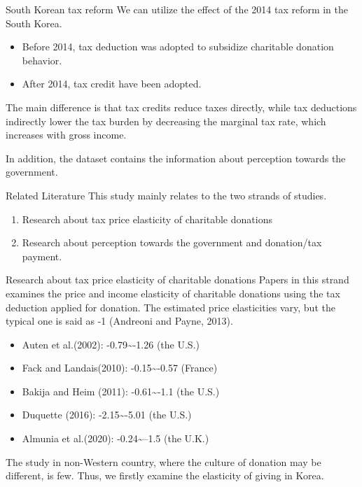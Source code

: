 \documentclass[
  ignorenonframetext,
]{beamer}
\providecommand{\tightlist}{%
  \setlength{\itemsep}{0pt}\setlength{\parskip}{0pt}}
\begin{document}
\begin{frame}{South Korean tax reform}
\protect\hypertarget{south-korean-tax-reform}{}
We can utilize the effect of the 2014 tax reform in the South Korea.

\begin{itemize}
\tightlist
\item
  Before 2014, tax deduction was adopted to subsidize charitable donation behavior.
\item
  After 2014, tax credit have been adopted.
\end{itemize}

The main difference is that tax credits reduce taxes directly, while tax deductions indirectly lower the tax burden by decreasing the marginal tax rate, which increases with gross income.

In addition, the dataset contains the information about perception towards the government.
\end{frame}

\begin{frame}{Related Literature}
\protect\hypertarget{related-literature}{}
This study mainly relates to the two strands of studies.

\begin{enumerate}
\tightlist
\item
  Research about tax price elasticity of charitable donations
\item
  Research about perception towards the government and donation/tax payment.
\end{enumerate}
\end{frame}

\begin{frame}{Research about tax price elasticity of charitable donations}
\protect\hypertarget{research-about-tax-price-elasticity-of-charitable-donations}{}
Papers in this strand examines the price and income elasticity of charitable donations using the tax deduction applied for donation.
The estimated price elasticities vary, but the typical one is said as -1 (Andreoni and Payne, 2013).

\begin{itemize}
\tightlist
\item
  Auten et al.(2002): -0.79\textasciitilde-1.26 (the U.S.)
\item
  Fack and Landais(2010): -0.15\textasciitilde-0.57 (France)
\item
  Bakija and Heim (2011): -0.61\textasciitilde-1.1 (the U.S.)
\item
  Duquette (2016): -2.15\textasciitilde-5.01 (the U.S.)
\item
  Almunia et al.(2020): -0.24\textasciitilde--1.5 (the U.K.)
\end{itemize}

The study in non-Western country, where the culture of donation may be different, is few.
Thus, we firstly examine the elasticity of giving in Korea.
\end{frame}
\end{document}
